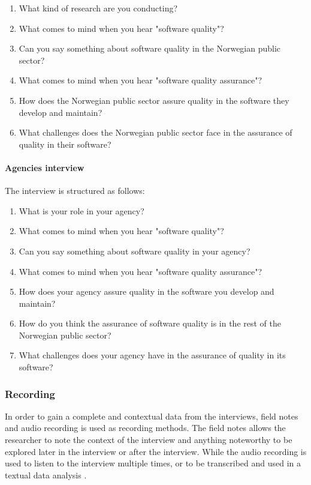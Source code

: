 \begin{enumerate}
    \item What kind of research are you conducting?
    \item What comes to mind when you hear "software quality"?
    \item Can you say something about software quality in the Norwegian public sector?
    \item What comes to mind when you hear "software quality assurance"?
    \item How does the Norwegian public sector assure quality in the software they develop and maintain?
    \item What challenges does the Norwegian public sector face in the assurance of quality in their software?
\end{enumerate}

\paragraph{Agencies interview}
The interview is structured as follows:

\begin{enumerate}
    \item What is your role in your agency?
    \item What comes to mind when you hear "software quality"?
    \item Can you say something about software quality in your agency?
    \item What comes to mind when you hear "software quality assurance"?
    \item How does your agency assure quality in the software you develop and maintain?
    \item How do you think the assurance of software quality is in the rest of the Norwegian public sector?
    \item What challenges does your agency have in the assurance of quality in its software?
\end{enumerate}

\subsubsection{Recording}
In order to gain a complete and contextual data from the interviews, field notes and audio recording is used as recording methods. The field notes allows the researcher to note the context of the interview and anything noteworthy to be explored later in the interview or after the interview. While the audio recording is used to listen to the interview multiple times, or to be transcribed and used in a textual data analysis \cite{bjo_2022}.


